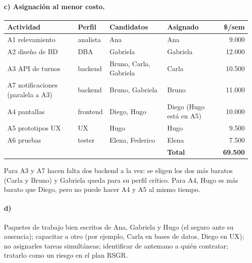 \documentclass[11pt,a4paper]{article}
\begin{document}
\paragraph{c) Asignación al menor costo.}
\begin{center}\small
\begin{tabular}{llll r}
\toprule
Actividad & Perfil & Candidatos & Asignado & \$/sem\\
\midrule
A1 relevamiento & analista & Ana & Ana & 9.000\\
A2 diseño de BD & DBA & Gabriela & Gabriela & 12.000\\
A3 API de turnos & backend & Bruno, Carla, Gabriela & Carla & 10.500\\
A7 notificaciones (paralela a A3) & backend & Bruno, Gabriela & Bruno & 11.000\\
A4 pantallas & frontend & Diego, Hugo & Diego (Hugo está en A5) & 10.000\\
A5 prototipos UX & UX & Hugo & Hugo & 9.500\\
A6 pruebas & tester & Elena, Federico & Elena & 7.500\\
\midrule
 & & & \textbf{Total} & \textbf{69.500}\\
\bottomrule
\end{tabular}
\end{center}
Para A3 y A7 hacen falta dos backend a la vez: se eligen los dos más baratos (Carla y Bruno) y Gabriela queda para
su perfil crítico. Para A4, Hugo es más barato que Diego, pero no puede hacer A4 y A5 al mismo tiempo.
\paragraph{d)} Paquetes de trabajo bien escritos de Ana, Gabriela y Hugo (el seguro ante su ausencia); capacitar a
otro (por ejemplo, Carla en bases de datos, Diego en UX); no asignarles tareas simultáneas; identificar de antemano
a quién contratar; tratarlo como un riesgo en el plan RSGR.
\end{document}
